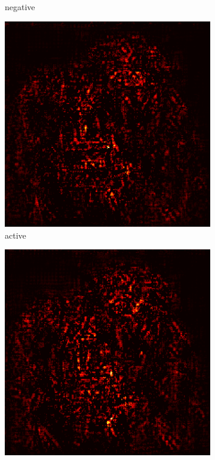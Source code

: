 \documentclass[preprint,12pt]{elsarticle}
\begin{document}
\begin{figure}
\begin{subfigure}{0.14\textwidth}
        \caption{negative}
    \end{subfigure}
    \hfill
    \begin{subfigure}{0.14\textwidth}
        \centering
        \includegraphics[width=\linewidth]{../visualizations/examples/imagenette/resnet18/active_saliency_map/8.png}
        \caption{active}
    \end{subfigure}
    \hfill
    \begin{subfigure}{0.14\textwidth}
        \centering
        \includegraphics[width=\linewidth]{../visualizations/examples/imagenette/resnet18/inactive_saliency_map/8.png}

\end{subfigure}
\end{figure}
\end{document}
